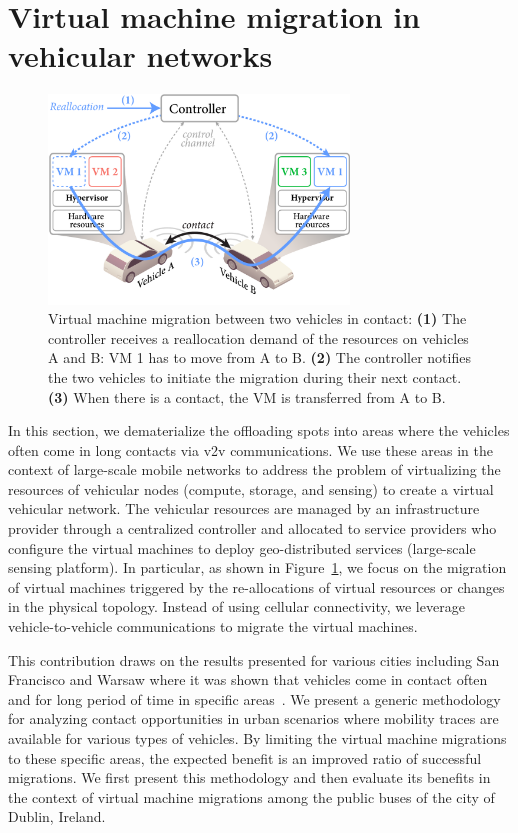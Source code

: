 \clearpage
\section{Virtual machine migration in vehicular networks}
\label{sec:virtual-vehicular-network}

\begin{figure}
\centering
\includegraphics[width=8cm]{figures/VMMigration.pdf}
\caption{Virtual machine migration between two vehicles in contact: \textbf{(1)} The controller receives a reallocation demand of the resources on vehicles A and B: VM 1 has to move from A to B. \textbf{(2)} The controller notifies the two vehicles to initiate the migration during their next contact. \textbf{(3)} When there is a contact, the VM is transferred from A to B.}
\label{fig:vm-migration}
\end{figure}
In this section, we dematerialize the offloading spots into areas where the vehicles often come in long contacts via \acrfull{v2v} communications. We use these areas in the context of large-scale mobile networks to address the problem of virtualizing the resources of vehicular nodes (\ie compute, storage, and sensing) to create a virtual vehicular network. The vehicular resources are managed by an infrastructure provider through a centralized controller and allocated to service providers who configure the virtual machines to deploy geo-distributed services (\eg large-scale sensing platform). In particular, as shown in Figure~\ref{fig:vm-migration}, we focus on the migration of virtual machines triggered by the re-allocations of virtual resources or changes in the physical topology. Instead of using cellular connectivity, we leverage vehicle-to-vehicle communications to migrate the virtual machines.

This contribution draws on the results presented for various cities including San Francisco and Warsaw where it was shown that vehicles come in contact often and for long period of time in specific areas~\cite{kang2004extracting,sarafijanovic2006island,uppoor2014generation,naboulsi2013instantaneous}. We present a generic methodology for analyzing contact opportunities in urban scenarios where mobility traces are available for various types of vehicles. By limiting the virtual machine migrations to these specific areas, the expected benefit is an improved ratio of successful migrations. We first present this methodology and then evaluate its benefits in the context of virtual machine migrations among the public buses of the city of Dublin, Ireland.


